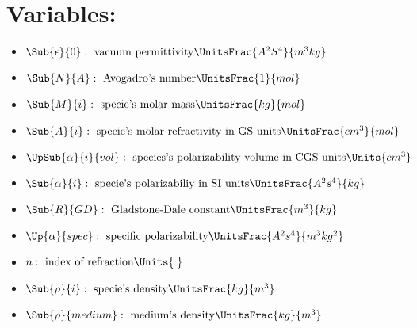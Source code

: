 




    
    \section*{Variables:}
    \begin{itemize}
        \item $ \Sub{\epsilon}{0}:\text{ vacuum permittivity}\UnitsFrac{A^2S^4}{m^3kg} $ 
        \item $ \Sub{N}{A}:\text{ Avogadro's number}\UnitsFrac{1}{mol} $
        \item $ \Sub{M}{i}:\text{ specie's molar mass}\UnitsFrac{kg}{mol} $
        \item $ \Sub{A}{i}: \text{ specie's molar refractivity in GS units}\UnitsFrac{cm^3}{mol} $ 
        \item $ \UpSub{\alpha}{i}{vol}:\text{ species's polarizability volume in CGS units}\Units{cm^3} $
        \item $ \Sub{\alpha}{i}:\text{ specie's polarizabiliy in SI units}\UnitsFrac{A^2s^4}{kg} $
        \item $ \Sub{R}{GD}:\text{ Gladstone-Dale constant}\UnitsFrac{m^3}{kg} $
        \item $ \Up{\alpha}{spec}:\text{ specific polarizability}\UnitsFrac{A^2s^4}{m^3kg^2} $
        \item $ n:\text{ index of refraction}\Units{\;} $
        \item $ \Sub{\rho}{i}:\text{ specie's density}\UnitsFrac{kg}{m^3} $
        \item $ \Sub{\rho}{medium}:\text{ medium's density}\UnitsFrac{kg}{m^3} $
    \end{itemize}
        
